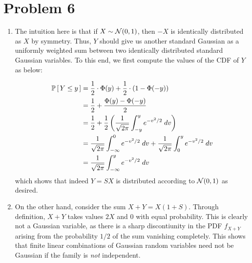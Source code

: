 \documentclass[12pt]{article}%
\begin{document}
\section{Problem 6}
\begin{enumerate}
  \item The intuition here is that if $X \sim \mathcal{N}(0,1)$, then $-X$ is identically distributed as $X$ by symmetry. Thus, $Y$ should give us another standard Gaussian as a uniformly weighted sum between two identically distributed standard Gaussian variables. To this end, we first compute the values of the CDF of $Y$ as below:

  \begin{align*}
    \mathbb{P}\left[\,Y \leq y\,\right] & = \frac{1}{2}\cdot \Phi(y) + \frac{1}{2}\cdot (1 - \Phi(-y)) \\
    & = \frac{1}{2} +\frac{\Phi(y) - \Phi(-y)}{2} \\
    & = \frac{1}{2} +\frac{1}{2} \left(\frac{1}{\sqrt{2\pi}} \int_{-y}^y e^{-v^2/2}\; dv\right) \\
    & = \frac{1}{\sqrt{2\pi}} \int^{0}_{-\infty} e^{-v^2/2} \; dv + \frac{1}{\sqrt{2\pi}} \int_{0}^y e^{-v^2/2} \; dv \\
    & = \frac{1}{\sqrt{2\pi}} \int_{-\infty}^{y} e^{-v^2/2} \; dv
  \end{align*}
  which shows that indeed $Y = SX$ is distributed according to $\mathcal{N}(0,1)$ as desired.

  \item On the other hand, consider the sum $X + Y = X(1+S)$. Through definition, $X+Y$ takes values $2X$ and $0$ with equal probability. This is clearly not a Gaussian variable, as there is a sharp discontiunity in the PDF $f_{X+Y}$ arising from the probability $1/2$ of the sum vanishing completely. This shows that finite linear combinations of Gaussian random variables need not be Gaussian if the family is \emph{not} independent.
\end{enumerate}
\end{document}
